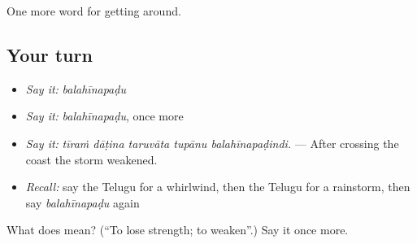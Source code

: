 \begin{grammarlens}[title={What you've built}]
One more word for getting around.
\end{grammarlens}

\subsection*{Your turn}
\begin{itemize}
\raggedright
  \item \emph{Say it:} \emph{balahīnapaḍu}
  \item \emph{Say it:} \emph{balahīnapaḍu}, once more
  \item \emph{Say it:} \emph{tīraṁ dāṭina taruvāta tupānu balahīnapaḍindi.} — After crossing the coast the storm weakened.
  \item \emph{Recall:} say the Telugu for a whirlwind, then the Telugu for a rainstorm, then say \emph{balahīnapaḍu} again
\end{itemize}

\begin{tcolorbox}[breakable,colback=teal!4,colframe=teal!35!black,title={Before you move on}]
What does  mean? (\textquotedblleft{}To lose strength; to weaken\textquotedblright{}.) Say it once more.
\end{tcolorbox}
